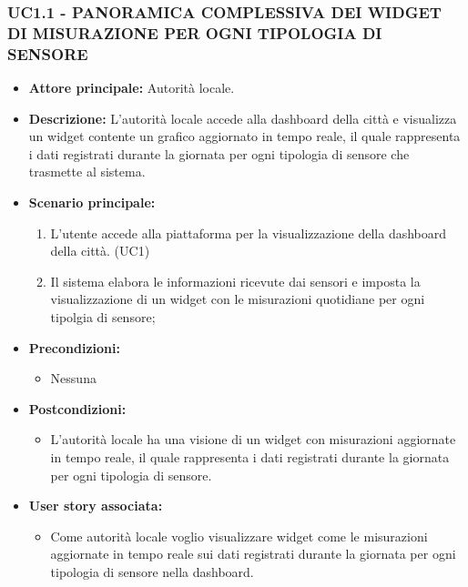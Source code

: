\subsubsection{UC1.1 - PANORAMICA COMPLESSIVA DEI WIDGET DI MISURAZIONE PER OGNI TIPOLOGIA DI SENSORE}
\begin{itemize}
    \item \textbf{Attore principale:} Autorità locale.
    \item \textbf{Descrizione:} L'autorità locale accede alla dashboard della città e visualizza un widget contente un grafico aggiornato in tempo reale, il quale rappresenta i dati registrati durante la giornata per ogni tipologia di sensore che trasmette al sistema.
    \item \textbf{Scenario principale:}
        \begin{enumerate}
            \item L'utente accede alla piattaforma per la visualizzazione della dashboard della città. (UC1)
            \item Il sistema elabora le informazioni ricevute dai sensori e imposta la visualizzazione di un widget con le misurazioni quotidiane per ogni tipolgia di sensore;
        \end{enumerate}
    \item \textbf{Precondizioni:}
        \begin{itemize}
            \item Nessuna
        \end{itemize}
    \item \textbf{Postcondizioni:}
        \begin{itemize}
            \item L'autorità locale ha una visione di un widget con misurazioni aggiornate in tempo reale, il quale rappresenta i dati registrati durante la giornata per ogni tipologia di sensore.
        \end{itemize}
    \item \textbf{User story associata:}
        \begin{itemize}
            \item Come autorità locale voglio visualizzare widget come le misurazioni aggiornate in tempo reale sui dati registrati durante la giornata per ogni tipologia di sensore nella dashboard.
        \end{itemize}
\end{itemize}
